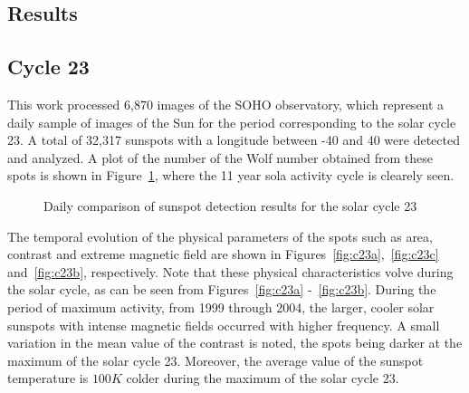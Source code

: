 \documentclass[namedreferences]{solarphysics}
\begin{document}
\begin{article}
\section{Results} %
      \label{S-results}      

\subsection{Cycle 23} %
  \label{S-cycle23}
This work processed 6,870 images of the SOHO observatory, which represent a daily sample of images of the Sun for the period corresponding to the solar cycle 23.
A total of 32,317 sunspots with a longitude between -40 and 40 were detected and analyzed.
A plot of the number of the Wolf number obtained from these spots is shown in Figure~\ref{gr:ciclo23}, where the 11 year sola activity cycle is clearely seen.

\begin{figure} [!htbp]
\caption{Daily comparison of sunspot detection results for the solar cycle 23}
\label{gr:ciclo23}
\end{figure}

The temporal evolution of the physical parameters of the spots such as area, contrast and extreme magnetic field are shown in Figures~\ref{fig:c23a},~\ref{fig:c23c} and~\ref{fig:c23b}, respectively.
Note that these physical characteristics volve during the solar cycle, as can be seen from Figures~\ref{fig:c23a} -~\ref{fig:c23b}.
During the period of maximum activity, from 1999 through 2004, the larger, cooler solar sunspots with intense magnetic fields occurred with higher frequency.
A small variation in the mean value of the contrast is noted, the spots being darker at the maximum of the solar cycle 23.
Moreover, the average value of the sunspot temperature is $100 K$ colder during the maximum of the solar cycle 23.


\end{article}
\end{document}
